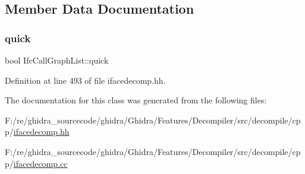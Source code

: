 \subsection{Member Data Documentation}
\mbox{\label{class_ifc_call_graph_list_a1ed0d0deb8a5e563f82d204b36aae05f}} 
\subsubsection{\texorpdfstring{quick}{quick}}
{\footnotesize\ttfamily bool Ifc\+Call\+Graph\+List\+::quick\hspace{0.3cm}{\ttfamily [protected]}}



Definition at line 493 of file ifacedecomp.\+hh.



The documentation for this class was generated from the following files\+:\begin{DoxyCompactItemize}
\item 
F\+:/re/ghidra\+\_\+sourcecode/ghidra/\+Ghidra/\+Features/\+Decompiler/src/decompile/cpp/\mbox{\hyperlink{ifacedecomp_8hh}{ifacedecomp.\+hh}}\item 
F\+:/re/ghidra\+\_\+sourcecode/ghidra/\+Ghidra/\+Features/\+Decompiler/src/decompile/cpp/\mbox{\hyperlink{ifacedecomp_8cc}{ifacedecomp.\+cc}}\end{DoxyCompactItemize}
